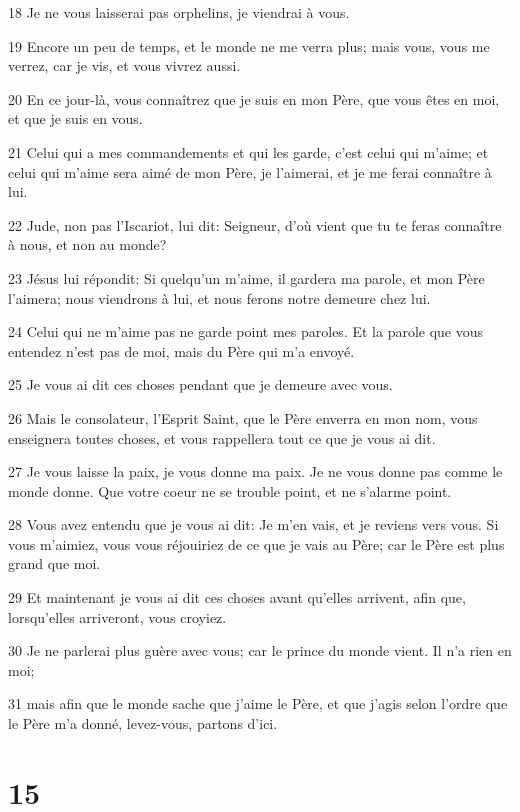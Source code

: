 \par 18 Je ne vous laisserai pas orphelins, je viendrai à vous.
\par 19 Encore un peu de temps, et le monde ne me verra plus; mais vous, vous me verrez, car je vis, et vous vivrez aussi.
\par 20 En ce jour-là, vous connaîtrez que je suis en mon Père, que vous êtes en moi, et que je suis en vous.
\par 21 Celui qui a mes commandements et qui les garde, c'est celui qui m'aime; et celui qui m'aime sera aimé de mon Père, je l'aimerai, et je me ferai connaître à lui.
\par 22 Jude, non pas l'Iscariot, lui dit: Seigneur, d'où vient que tu te feras connaître à nous, et non au monde?
\par 23 Jésus lui répondit: Si quelqu'un m'aime, il gardera ma parole, et mon Père l'aimera; nous viendrons à lui, et nous ferons notre demeure chez lui.
\par 24 Celui qui ne m'aime pas ne garde point mes paroles. Et la parole que vous entendez n'est pas de moi, mais du Père qui m'a envoyé.
\par 25 Je vous ai dit ces choses pendant que je demeure avec vous.
\par 26 Mais le consolateur, l'Esprit Saint, que le Père enverra en mon nom, vous enseignera toutes choses, et vous rappellera tout ce que je vous ai dit.
\par 27 Je vous laisse la paix, je vous donne ma paix. Je ne vous donne pas comme le monde donne. Que votre coeur ne se trouble point, et ne s'alarme point.
\par 28 Vous avez entendu que je vous ai dit: Je m'en vais, et je reviens vers vous. Si vous m'aimiez, vous vous réjouiriez de ce que je vais au Père; car le Père est plus grand que moi.
\par 29 Et maintenant je vous ai dit ces choses avant qu'elles arrivent, afin que, lorsqu'elles arriveront, vous croyiez.
\par 30 Je ne parlerai plus guère avec vous; car le prince du monde vient. Il n'a rien en moi;
\par 31 mais afin que le monde sache que j'aime le Père, et que j'agis selon l'ordre que le Père m'a donné, levez-vous, partons d'ici.

\chapter{15}

